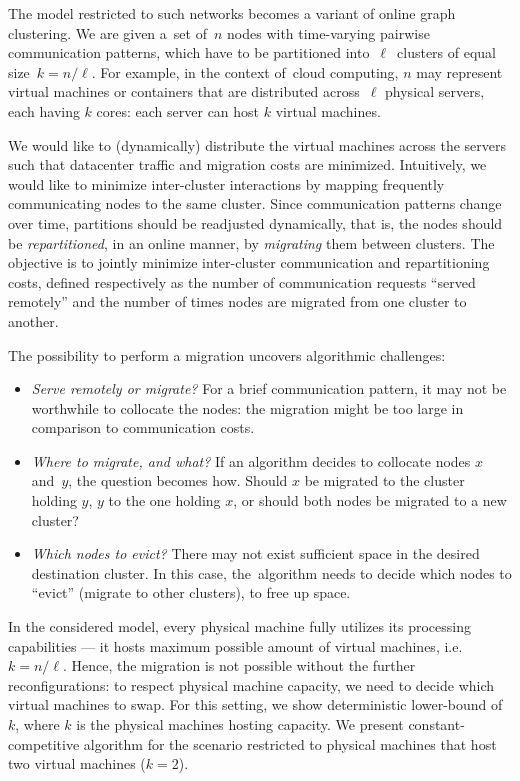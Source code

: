 The model restricted to such networks becomes a variant of online graph clustering.
We are given a~set of~$n$ nodes with time-varying pairwise
communication patterns, which have to be partitioned into~$\ell$~clusters of
equal size~$k=n/\ell$. For example, in the context of~cloud computing, $n$ may represent virtual machines
or containers that are distributed across~$\ell$ physical servers, each having
$k$ cores: each server can host $k$ virtual machines.

We would like to
(dynamically) distribute the virtual machines across the servers such that
datacenter traffic and migration costs are minimized.
Intuitively, we would like to minimize inter-cluster
interactions by mapping frequently communicating nodes to the same cluster.
Since communication patterns change over time, partitions should be
readjusted dynamically, that is, the nodes should be \emph{repartitioned}, in
an online manner, by \emph{migrating} them between clusters. The objective is
to jointly minimize inter-cluster communication and repartitioning costs,
defined respectively as the number of communication requests ``served
remotely'' and the number of times nodes are migrated from one cluster to
another.


The possibility to perform a migration uncovers algorithmic challenges:
\begin{itemize}

\item \emph{Serve remotely or migrate?} For a brief communication
pattern, it may not be worthwhile to collocate the nodes: the migration might
be too large in comparison to communication costs.

\item \emph{Where to migrate, and what?}
If an algorithm decides to collocate nodes $x$ and~$y$, the question becomes
how. Should $x$ be migrated to the cluster holding $y$, $y$ to the one holding
$x$, or should both nodes be migrated to a new cluster?

\item \emph{Which nodes to evict?}
There may not exist sufficient space in the desired destination cluster. In
this case, the~algorithm needs to decide which nodes to ``evict'' (migrate to
other clusters), to free up space.

\end{itemize}

In the considered model, every physical machine fully utilizes its processing capabilities --- it hosts maximum possible amount of virtual machines, i.e. $k=n/\ell$.
Hence, the migration is not possible without the further reconfigurations: to respect physical machine capacity, we need to decide which virtual machines to swap.
For this setting, we show deterministic lower-bound of $k$, where $k$ is the physical machines hosting capacity.
We present constant-competitive algorithm for the scenario restricted to physical machines that host two virtual machines ($k = 2$).

